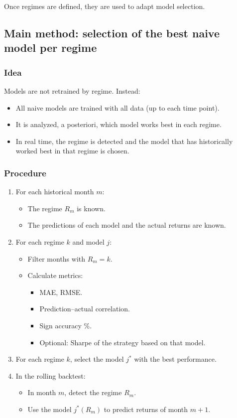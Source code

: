 \documentclass[12pt]{article}
\begin{document}
Once regimes are defined, they are used to adapt model selection.

\subsection{Main method: selection of the best naive model per regime}

\subsubsection*{Idea}

Models are not retrained by regime. Instead:

\begin{itemize}
    \item All naive models are trained with all data (up to each time point).
    \item It is analyzed, a posteriori, which model works best in each regime.
    \item In real time, the regime is detected and the model that has historically worked best in that regime is chosen.
\end{itemize}

\subsubsection*{Procedure}

\begin{enumerate}
    \item For each historical month $m$:
    \begin{itemize}
        \item The regime $R_m$ is known.
        \item The predictions of each model and the actual returns are known.
    \end{itemize}
    \item For each regime $k$ and model $j$:
    \begin{itemize}
        \item Filter months with $R_m = k$.
        \item Calculate metrics:
        \begin{itemize}
            \item MAE, RMSE.
            \item Prediction--actual correlation.
            \item Sign accuracy \%.
            \item Optional: Sharpe of the strategy based on that model.
        \end{itemize}
    \end{itemize}
    \item For each regime $k$, select the model $j^\ast$ with the best performance.
    \item In the rolling backtest:
    \begin{itemize}
        \item In month $m$, detect the regime $R_m$.
        \item Use the model $j^\ast(R_m)$ to predict returns of month $m+1$.
    \end{itemize}
\end{enumerate}
\end{document}
